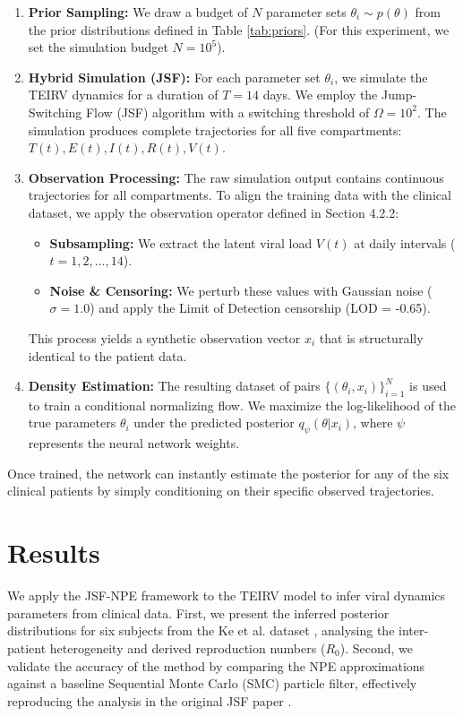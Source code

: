 \documentclass{article}
\begin{document}
\begin{enumerate}
    \item \textbf{Prior Sampling:} 
    We draw a budget of $N$ parameter sets $\theta_i \sim p(\theta)$ from the prior distributions defined in Table \ref{tab:priors}. (For this experiment, we set the simulation budget $N = 10^5$).

    \item \textbf{Hybrid Simulation (JSF):} 
    For each parameter set $\theta_i$, we simulate the TEIRV dynamics for a duration of $T = 14$ days. We employ the Jump-Switching Flow (JSF) algorithm with a switching threshold of $\Omega = 10^2$. The simulation produces complete trajectories for all five compartments: $T(t), E(t), I(t), R(t), V(t)$.
    

    
    

    \item \textbf{Observation Processing:} 
    The raw simulation output contains continuous trajectories for all compartments. To align the training data with the clinical dataset, we apply the observation operator defined in Section 4.2.2:
    \begin{itemize}
        \item \textbf{Subsampling:} We extract the latent viral load $V(t)$ at daily intervals ($t = 1, 2, \dots, 14$).
        \item \textbf{Noise \& Censoring:} We perturb these values with Gaussian noise ($\sigma = 1.0$) and apply the Limit of Detection censorship (LOD = -0.65). 
    \end{itemize}
    This process yields a synthetic observation vector $x_i$ that is structurally identical to the patient data.

    \item \textbf{Density Estimation:} 
    The resulting dataset of pairs $\{(\theta_i, x_i)\}_{i=1}^N$ is used to train a conditional normalizing flow. We maximize the log-likelihood of the true parameters $\theta_i$ under the predicted posterior $q_\psi(\theta | x_i)$, where $\psi$ represents the neural network weights.
\end{enumerate}
Once trained, the network can instantly estimate the posterior for any of the six clinical patients by simply conditioning on their specific observed trajectories.



\section{Results} \label{sec:results}
We apply the JSF-NPE framework to the TEIRV model to infer viral dynamics parameters from clinical data. First, we present the inferred posterior distributions for six subjects from the Ke et al. dataset \cite{Ke2022SarsData}, analysing the inter-patient heterogeneity and derived reproduction numbers ($R_0$). Second, we validate the accuracy of the method by comparing the NPE approximations against a baseline Sequential Monte Carlo (SMC) particle filter, effectively reproducing the analysis in the original JSF paper \cite{Germano2024JSF}. 
\end{document}
